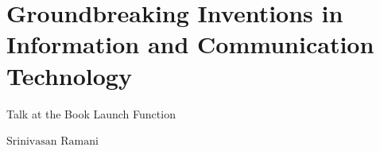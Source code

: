\chapter{Groundbreaking Inventions in Information and Communication Technology}

\vskip -12pt

\centerline{{\LARGE Talk at the Book Launch Function}}

\vskip 0.8cm

\begin{center}
{\large\uppercase{$\text{Srinivasan Ramani}$}} 


\vskip -6pt

\end{center}

\vskip 2cm




\vfill




\newpage

